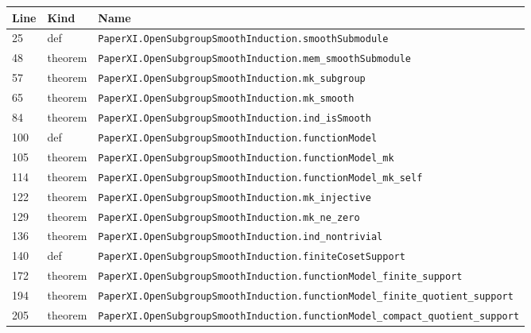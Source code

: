 \documentclass[10pt,oneside]{book}
\begin{document}
\begin{longtable}{@{}p{}p{}p{}@{}}\toprule Line&Kind&Name\\\midrule\endhead

25&def&\nolinkurl{PaperXI.OpenSubgroupSmoothInduction.smoothSubmodule}\\

48&theorem&\nolinkurl{PaperXI.OpenSubgroupSmoothInduction.mem_smoothSubmodule}\\

57&theorem&\nolinkurl{PaperXI.OpenSubgroupSmoothInduction.mk_subgroup}\\

65&theorem&\nolinkurl{PaperXI.OpenSubgroupSmoothInduction.mk_smooth}\\

84&theorem&\nolinkurl{PaperXI.OpenSubgroupSmoothInduction.ind_isSmooth}\\

100&def&\nolinkurl{PaperXI.OpenSubgroupSmoothInduction.functionModel}\\

105&theorem&\nolinkurl{PaperXI.OpenSubgroupSmoothInduction.functionModel_mk}\\

114&theorem&\nolinkurl{PaperXI.OpenSubgroupSmoothInduction.functionModel_mk_self}\\

122&theorem&\nolinkurl{PaperXI.OpenSubgroupSmoothInduction.mk_injective}\\

129&theorem&\nolinkurl{PaperXI.OpenSubgroupSmoothInduction.mk_ne_zero}\\

136&theorem&\nolinkurl{PaperXI.OpenSubgroupSmoothInduction.ind_nontrivial}\\

140&def&\nolinkurl{PaperXI.OpenSubgroupSmoothInduction.finiteCosetSupport}\\

172&theorem&\nolinkurl{PaperXI.OpenSubgroupSmoothInduction.functionModel_finite_support}\\

194&theorem&\nolinkurl{PaperXI.OpenSubgroupSmoothInduction.functionModel_finite_quotient_support}\\

205&theorem&\nolinkurl{PaperXI.OpenSubgroupSmoothInduction.functionModel_compact_quotient_support}\\


\end{longtable}
\end{document}
